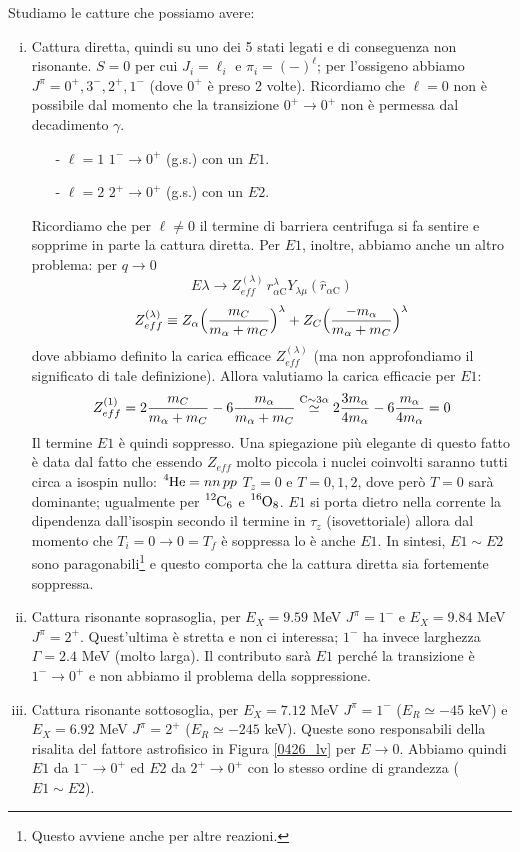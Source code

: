 \noindent Studiamo le catture che possiamo avere:
\begin{enumerate}[i.]
	\item Cattura diretta, quindi su uno dei 5 stati legati e di conseguenza non risonante. $S=0$ per cui $J_i = \ell_i$ e $\pi_i = (-)^\ell$; per l'ossigeno abbiamo $J^\pi = 0^+,3^-,2^+,1^-$ (dove $0^+$ è preso 2 volte). Ricordiamo che $\ell=0$ non è possibile dal momento che la transizione $0^+\to0^+$ non è permessa dal decadimento $\gamma$.
	\begin{itemize}
		\item[-] $\ell =1$ $1^-\to0^+$ (g.s.) con un $E1$.
		\item[-] $\ell=2$ $2^+\to0^+$ (g.s.) con un $E2$. 
	\end{itemize}
	Ricordiamo che per $\ell\not = 0$ il termine di barriera centrifuga si fa sentire e sopprime in parte la cattura diretta. Per $E1$, inoltre, abbiamo anche un altro problema: per $q\to0$ 
	$$E\lambda \to Z_{eff}^{(\lambda)}\,r_{\alpha\mbox{C}}^\lambda Y_{\lambda \mu}(\hat{r}_{\alpha\mbox{C}})$$
	$$Z_{eff}^{(\lambda)} \equiv Z_\alpha \Bigl ( \frac{m_{C}}{m_\alpha + m_{C}} \Bigr )^\lambda + Z_C \Bigl ( \frac{-m_\alpha}{m_\alpha+m_C} \Bigr )^\lambda$$
	dove abbiamo definito la carica efficace $Z_{eff}^{(\lambda)}$ (ma non approfondiamo il significato di tale definizione). Allora valutiamo la carica efficacie per $E1$:
	$$Z_{eff}^{(1)} = 2{\frac{m_{C}}{m_\alpha + m_{C}}} - 6 {\frac{m_\alpha}{m_\alpha+m_C}} \stackrel{\ce{C}\sim 3\alpha}{\simeq} 2 \frac{3m_\alpha}{4m_\alpha} - 6 \frac{m_\alpha}{4m_\alpha} = 0$$
	Il termine $E1$ è quindi soppresso. Una spiegazione più elegante di questo fatto è data dal fatto che essendo $Z_{eff}$ molto piccola i nuclei coinvolti saranno tutti circa a isospin nullo: $\ce{^4He} = nn\, pp$ $T_z=0$ e $T=0,1,2$, dove però $T=0$ sarà dominante; ugualmente per $\ce{^12C_6}$ e $\ce{^{16}O_8}$. $E1$ si porta dietro nella corrente la dipendenza dall'isospin secondo il termine in $\tau_z$ (isovettoriale) allora dal momento che $T_i=0\to0=T_f$ è soppressa lo è anche $E1$. In sintesi, $E1\sim E2$ sono paragonabili\footnote{Questo avviene anche per altre reazioni.} %
	e questo comporta che la cattura diretta sia fortemente soppressa.
	\item Cattura risonante soprasoglia, per $E_X = 9.59$ MeV $J^\pi = 1^-$ e $E_X = 9.84$ MeV $J^\pi = 2^+$. Quest'ultima è stretta e non ci interessa; $1^-$ ha invece larghezza $\Gamma=2.4$ MeV (molto larga). Il contributo sarà $E1$ perché la transizione è $1^-\to0^+$ e non abbiamo il problema della soppressione.
	\item Cattura risonante sottosoglia, per $E_X = 7.12$ MeV $J^\pi =1^-$ ($E_R\simeq -45$ keV) e $E_X = 6.92$ MeV $J^\pi =2^+$ ($E_R\simeq -245$ keV). Queste sono responsabili della risalita del fattore astrofisico in Figura \ref{0426_lv} per $E\to0$. Abbiamo quindi $E1$ da $1^-\to0^+$ ed $E2$ da $2^+\to0^+$ con lo stesso ordine di grandezza ($E1\sim E2$).
\end{enumerate}


